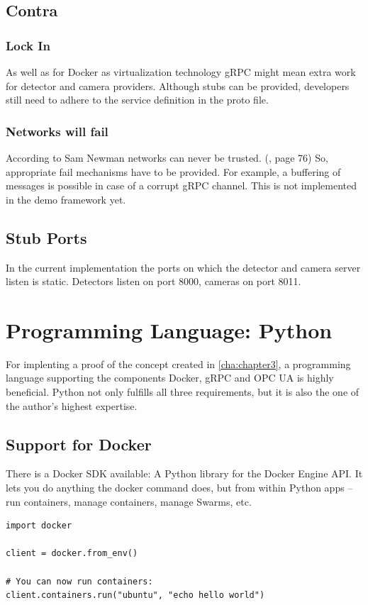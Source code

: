 \subsection{Contra}
\subsubsection{Lock In}
As well as for Docker as virtualization technology gRPC might mean extra work for detector and camera providers. Although stubs can be provided, developers still need to adhere to the service definition in the proto file.
\subsubsection{Networks will fail}
According to Sam Newman networks can never be trusted. (\cite{Newman2015BuildingMicroservices}, page 76) So, appropriate fail mechanisms have to be provided. For example, a buffering of messages is possible in case of a corrupt gRPC channel. This is not implemented in the demo framework yet.

\subsection{Stub Ports}
In the current implementation the ports on which the detector and camera server listen is static. Detectors listen on port 8000, cameras on port 8011. 

\section{Programming Language: Python}
For implenting a proof of the concept created in \ref{cha:chapter3}, a programming language supporting the components Docker, gRPC and OPC UA is highly beneficial. Python not only fulfills all three requirements, but it is also the one of the author's highest expertise.

\subsection{Support for Docker}
There is a Docker SDK available: A Python library for the Docker Engine API. It lets you do anything the docker command does, but from within Python apps – run containers, manage containers, manage Swarms, etc. \cite{LastvisitedMay4th2019DockerPython}
\begin{verbatim}
import docker

client = docker.from_env()

# You can now run containers:
client.containers.run("ubuntu", "echo hello world")
\end{verbatim}

